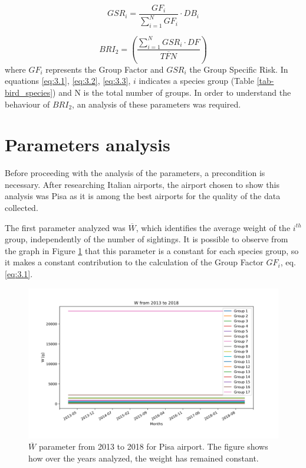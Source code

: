 \begin{equation} \label{eq:3.2}
GSR_i=\frac{GF_i}{\sum_{i=1}^{N}GF_i}\cdot DB_i
\end{equation}

\begin{equation} \label{eq:3.3}
BRI_2=\left(\frac{\sum_{i=1}^{N}GSR_i \cdot DF}{\overline{TFN}}\right)
\end{equation}
where $GF_i$ represents the Group Factor and $GSR_i$ the Group Specific Risk. In equations \ref{eq:3.1}, \ref{eq:3.2}, \ref{eq:3.3}, $i$ indicates a species group (Table \ref{tab-bird_species}) and N is the total number of groups.
In order to understand the behaviour of $BRI_2$, an analysis of these parameters was required.

\section{Parameters analysis}\label{parameters_analysis}
Before proceeding with the analysis of the parameters, a precondition is necessary. After researching Italian airports, the airport chosen to show this analysis was Pisa as it is among the best airports for the quality of the data collected.

The first parameter analyzed was $\overline{W}$, which identifies the average weight of the $i^{th}$ group, independently of the number of sightings.
It is possible to observe from the graph in Figure \ref{W_fig} that this parameter is a constant for each species group, so it makes a constant contribution to the calculation of the Group Factor $GF_i$, eq. \ref{eq:3.1}.

\begin{figure}
	\centering
	\includegraphics[width=13cm]{img/W.png}
	\caption{$\overline{W}$ parameter from 2013 to 2018 for Pisa airport. The figure shows how over the years analyzed, the weight has remained constant.}
	\label{W_fig}
\end{figure}


